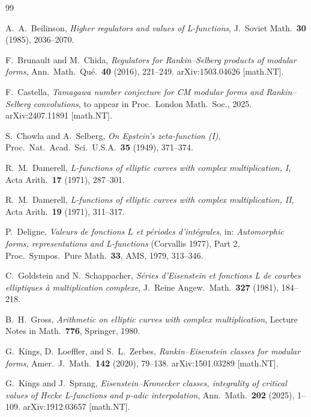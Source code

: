 \documentclass[11pt,a4paper]{amsart}
\theoremstyle{plain}
\theoremstyle{definition}
\begin{document}
\begin{thebibliography}{99}

A.~A.~Beilinson,
\textit{Higher regulators and values of L-functions},
J.~Soviet Math.\ \textbf{30} (1985), 2036--2070.

F.~Brunault and M.~Chida,
\textit{Regulators for Rankin--Selberg products of modular forms},
Ann.\ Math.\ Qu\'e.\ \textbf{40} (2016), 221--249.
arXiv:1503.04626 [math.NT].

F.~Castella,
\textit{Tamagawa number conjecture for CM modular forms and Rankin--Selberg
convolutions},
to appear in Proc.\ London Math.\ Soc., 2025.
arXiv:2407.11891 [math.NT].

S.~Chowla and A.~Selberg,
\textit{On Epstein's zeta-function (I)},
Proc.\ Nat.\ Acad.\ Sci.\ U.S.A.\ \textbf{35} (1949), 371--374.

R.~M.~Damerell,
\textit{L-functions of elliptic curves with complex multiplication, I},
Acta Arith.\ \textbf{17} (1971), 287--301.

R.~M.~Damerell,
\textit{L-functions of elliptic curves with complex multiplication, II},
Acta Arith.\ \textbf{19} (1971), 311--317.

P.~Deligne,
\textit{Valeurs de fonctions $L$ et p\'eriodes d'int\'egrales},
in: \emph{Automorphic forms, representations and L-functions} (Corvallis 1977),
Part 2,
Proc.\ Sympos.\ Pure Math.\ \textbf{33}, AMS, 1979, 313--346.

C.~Goldstein and N.~Schappacher,
\textit{S\'eries d'Eisenstein et fonctions L de courbes elliptiques \`a
multiplication complexe},
J.~Reine Angew.\ Math.\ \textbf{327} (1981), 184--218.

B.~H.~Gross,
\textit{Arithmetic on elliptic curves with complex multiplication},
Lecture Notes in Math.\ \textbf{776}, Springer, 1980.

G.~Kings, D.~Loeffler, and S.~L.~Zerbes,
\textit{Rankin--Eisenstein classes for modular forms},
Amer.\ J.\ Math.\ \textbf{142} (2020), 79--138.
arXiv:1501.03289 [math.NT].

G.~Kings and J.~Sprang,
\textit{Eisenstein--Kronecker classes, integrality of critical values of
Hecke L-functions and $p$-adic interpolation},
Ann.\ Math.\ \textbf{202} (2025), 1--109.
arXiv:1912.03657 [math.NT].


\end{thebibliography}
\end{document}
